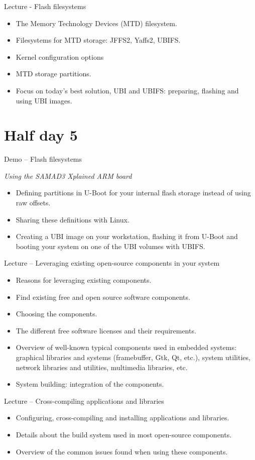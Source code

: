 \documentclass[a4paper,12pt,obeyspaces,spaces,hyphens]{article}
\begin{document}
\feagendaonecolumn
{Lecture - Flash filesystems}
{
  \begin{itemize}
  \item The Memory Technology Devices (MTD) filesystem.
  \item Filesystems for MTD storage: JFFS2, Yaffs2, UBIFS.
  \item Kernel configuration options
  \item MTD storage partitions.
  \item Focus on today's best solution, UBI and UBIFS:
	preparing, flashing and using UBI images.
  \end{itemize}
}

\section{Half day 5}

\feagendaonecolumn
{Demo – Flash filesystems}
{
  {\em Using the SAMAD3 Xplained ARM board}
  \begin{itemize}
  \item Defining partitions in U-Boot for your internal
        flash storage instead of using raw offsets.
  \item Sharing these definitions with Linux.
  \item Creating a UBI image on your workstation, flashing
        it from U-Boot and booting your system on one of
        the UBI volumes with UBIFS.
  \end{itemize}
}

\feagendatwocolumn
{Lecture – Leveraging existing open-source components in your system}
{
  \begin{itemize}
  \item Reasons for leveraging existing components.
  \item Find existing free and open source software components.
  \item Choosing the components.
  \item The different free software licenses and their requirements.
  \item Overview of well-known typical components used in
        embedded systems: graphical libraries and systems
        (framebuffer, Gtk, Qt, etc.), system utilities,
        network libraries and utilities, multimedia libraries, etc.
  \item System building: integration of the components.
  \end{itemize}
}
{Lecture – Cross-compiling applications and libraries}
{
  \begin{itemize}
  \item Configuring, cross-compiling and installing applications and libraries.
  \item Details about the build system used in most open-source components.
  \item Overview of the common issues found when using these components.
  \end{itemize}
}
\end{document}
